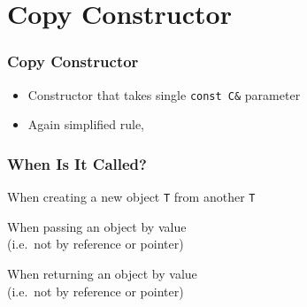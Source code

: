 \section{Copy Constructor}

\frame{\tableofcontents[currentsection]}

\begin{frame}
  \frametitle{Copy Constructor}
  \begin{itemize}
    \item Constructor that takes single \texttt{const C\&} parameter
    \item Again simplified rule, 
  \end{itemize}
\end{frame}

\begin{frame}
  \frametitle{When Is It Called?}
  \begin{overprint}
  \end{overprint}
  \vskip5mm
  \begin{overprint}
    \begin{center}
      When creating a new object \texttt{T} from another \texttt{T}
    \end{center}

    \begin{center}
      When passing an object by value \\ (i.e.\ not by reference or pointer)
    \end{center}

    \begin{center}
      When returning an object by value \\ (i.e.\ not by reference or pointer)
    \end{center}
  \end{overprint}
\end{frame}

